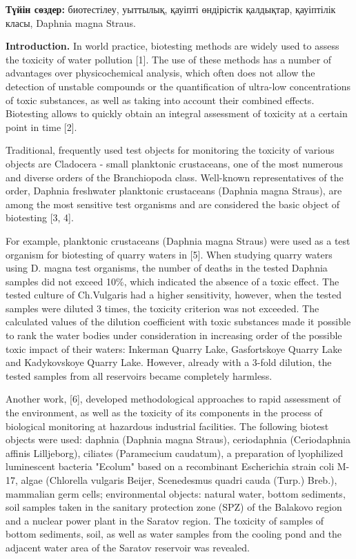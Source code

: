 {\bfseries Түйін сөздер:} биотестілеу, уыттылық, қауіпті өндірістік
қалдықтар, қауіптілік класы, Daphnia magna Straus.

\begin{multicols}{2}
{\bfseries Introduction.} In world practice, biotesting methods are widely
used to assess the toxicity of water pollution {[}1{]}. The use of these
methods has a number of advantages over physicochemical analysis, which
often does not allow the detection of unstable compounds or the
quantification of ultra-low concentrations of toxic substances, as well
as taking into account their combined effects. Biotesting allows to
quickly obtain an integral assessment of toxicity at a certain point in
time {[}2{]}.

Traditional, frequently used test objects for monitoring the toxicity of
various objects are Cladocera - small planktonic crustaceans, one of the
most numerous and diverse orders of the Branchiopoda class. Well-known
representatives of the order, Daphnia freshwater planktonic crustaceans
(Daphnia magna Straus), are among the most sensitive test organisms and
are considered the basic object of biotesting {[}3, 4{]}.

For example, planktonic crustaceans (Daphnia magna Straus) were used as
a test organism for biotesting of quarry waters in {[}5{]}. When
studying quarry waters using D. magna test organisms, the number of
deaths in the tested Daphnia samples did not exceed 10\%, which
indicated the absence of a toxic effect. The tested culture of
Ch.Vulgaris had a higher sensitivity, however, when the tested samples
were diluted 3 times, the toxicity criterion was not exceeded. The
calculated values of the dilution coefficient with toxic substances made
it possible to rank the water bodies under consideration in increasing
order of the possible toxic impact of their waters: Inkerman Quarry
Lake, Gasfortskoye Quarry Lake and Kadykovskoye Quarry Lake. However,
already with a 3-fold dilution, the tested samples from all reservoirs
became completely harmless.

Another work, {[}6{]}, developed methodological approaches to rapid
assessment of the environment, as well as the toxicity of its components
in the process of biological monitoring at hazardous industrial
facilities. The following biotest objects were used: daphnia (Daphnia
magna Straus), ceriodaphnia (Ceriodaphnia affinis Lilljeborg), ciliates
(Paramecium caudatum), a preparation of lyophilized luminescent bacteria
"Ecolum" based on a recombinant Escherichia strain coli M-17, algae
(Chlorella vulgaris Beijer, Scenedesmus quadri cauda (Turp.) Breb.),
mammalian germ cells; environmental objects: natural water, bottom
sediments, soil samples taken in the sanitary protection zone (SPZ) of
the Balakovo region and a nuclear power plant in the Saratov region. The
toxicity of samples of bottom sediments, soil, as well as water samples
from the cooling pond and the adjacent water area of the Saratov
reservoir was revealed.


\end{multicols}
